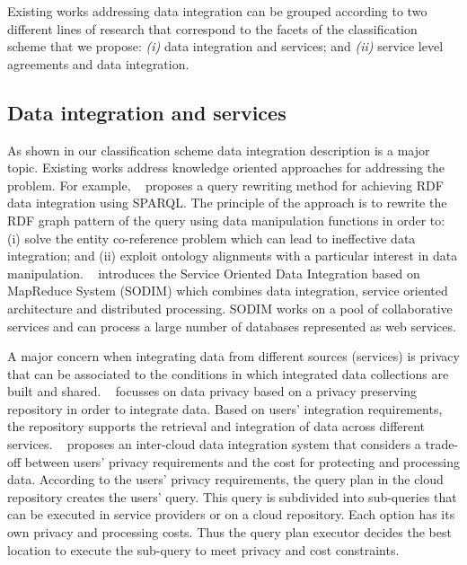 Existing works addressing data integration can be grouped according to  two different lines of research that correspond to the facets of the  classification scheme that we propose:
\textit{(i)} data integration and services; and
\textit{(ii)} service level agreements and data integration.


\subsection{Data integration and services}

As shown in our classification scheme data integration description is a major topic.  Existing works address knowledge oriented approaches for addressing the problem. For example, ~\cite{075} proposes a  query rewriting method for achieving RDF data integration
using SPARQL. The principle of the approach is to rewrite the RDF graph pattern of the query using data manipulation functions in order to: (i) solve 
the entity co-reference problem which can lead to ineffective data integration; 
and (ii) exploit ontology alignments with a particular interest in data manipulation. 
~\cite{078} introduces the  Service 
Oriented Data Integration based on MapReduce  System (SODIM)  which combines data integration,
service oriented architecture and distributed processing. SODIM works on a pool of collaborative services and can 
process a large number of databases represented as web services. 

A major concern when integrating data from different sources (services) is privacy that can be associated to the conditions in which integrated data collections are built and shared.
~\cite{YauY08} focusses on data privacy based on  a privacy preserving repository in order to integrate data. 
Based on users' integration requirements, the repository supports the retrieval and integration of
data across different services. 
~\cite{096} proposes an inter-cloud data integration system that considers a trade-off between users' privacy requirements and the cost for protecting and processing data.
According to the users' privacy requirements, the query plan  in the cloud repository 
creates the users' query. This query is subdivided into sub-queries that can
be  executed in  service providers or on a cloud repository.
Each option has its own  privacy and processing costs.
Thus the query plan executor decides the best location to execute the sub-query
to meet privacy and cost constraints.

